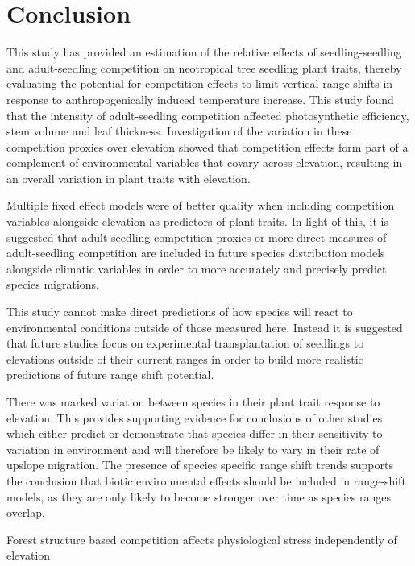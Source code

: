 \documentclass[a4paper, 11pt]{article}
\begin{document}
\section*{Conclusion}

This study has provided an estimation of the relative effects of seedling-seedling and adult-seedling competition on neotropical tree seedling plant traits, thereby evaluating the potential for competition effects to limit vertical range shifts in response to anthropogenically induced temperature increase. This study found that the intensity of adult-seedling competition affected photosynthetic efficiency, stem volume and leaf thickness. Investigation of the variation in these competition proxies over elevation showed that competition effects form part of a complement of environmental variables that covary across elevation, resulting in an overall variation in plant traits with elevation.

Multiple fixed effect models were of better quality when including competition variables alongside elevation as predictors of plant traits. In light of this, it is suggested that adult-seedling competition proxies or more direct measures of adult-seedling competition are included in future species distribution models alongside climatic variables in order to more accurately and precisely predict species migrations.

This study cannot make direct predictions of how species will react to environmental conditions outside of those measured here. Instead it is suggested that future studies focus on experimental transplantation of seedlings to elevations outside of their current ranges in order to build more realistic predictions of future range shift potential. 

There was marked variation between species in their plant trait response to elevation. This provides supporting evidence for conclusions of other studies which either predict or demonstrate that species differ in their sensitivity to variation in environment and will therefore be likely to vary in their rate of upslope migration. The presence of species specific range shift trends supports the conclusion that biotic environmental effects should be included in range-shift models, as they are only likely to become stronger over time as species ranges overlap.


Forest structure based competition affects physiological stress independently of elevation



\end{document}

